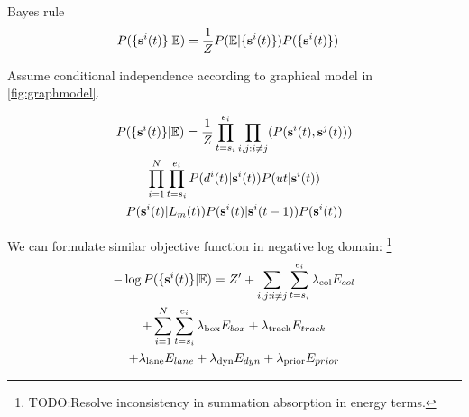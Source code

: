 Bayes rule
\begin{align}
  P(\{\mathbf{s}^{i}(t)\} | \mathbb{E}) &=
  \frac{1}{Z}P( \mathbb{E} | \{\mathbf{s}^{i}(t)\})P(\{\mathbf{s}^{i}(t)\})
\end{align}


Assume conditional independence according to graphical model in
\ref{fig:graphmodel}.

\begin{multline}
  P(\{\state{i}{t}\} | \mathbb{E}) =
  \frac{1}{Z}
  \prod_{t=s_i}^{e_i}\prod_{i,j: i \ne j}(P(\state{i}{t}, \state{j}{t}))\\
%
  \prod_{i=1}^{N}
  \prod_{t=s_i}^{e_i}
  P(\bb{i} | \state{i}{t})
  P(\trackp{t} | \state{i}{t})\\
  P(\state{i}{t} | L_m(t))
  P(\state{i}{t} | \state{i}{t-1})
  P(\state{i}{t})
\end{multline}

We can formulate similar objective function in negative log domain:
\footnote{TODO:Resolve inconsistency in summation absorption in energy terms.}
\begin{multline}
  -\log{P(\{\mathbf{s}^{i}(t)\} | \mathbb{E})} = 
  Z' + \sum_{i,j:i\ne j} \sum_{t=s_i}^{e_i}  \lambda_{\text{col}}E_{col} \\
  + \sum_{i=1}^N \sum_{t=s_i}^{e_i}
    \lambda_{\text{box}}E_{box}
  + \lambda_{\text{track}}E_{track}\\
  + \lambda_{\text{lane}}E_{lane}
  + \lambda_{\text{dyn}}E_{dyn}
  + \lambda_{\text{prior}}E_{prior}
\end{multline}
